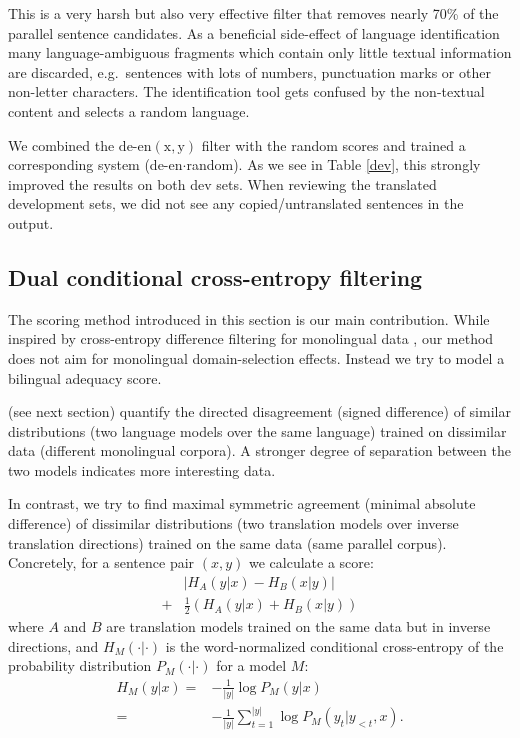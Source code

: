 \documentclass[11pt,a4paper]{article}
\begin{document}
This is a very harsh but also very effective filter that removes nearly 70\% of the parallel sentence candidates. As a beneficial side-effect of language identification many language-ambiguous fragments which contain only little textual information are discarded, e.g.~sentences with lots of numbers, punctuation marks or other non-letter characters. The identification tool gets confused by the non-textual content and selects a random language. 

We combined the $\mathrm{de\textrm{-}en(x,y)}$ filter with the random scores and trained a corresponding system (de-en$\cdot$random). As we see in Table \ref{dev}, this strongly improved the results on both dev sets. When reviewing the translated development sets, we did not see any copied/untranslated sentences in the output.  

\subsection{Dual conditional cross-entropy filtering}
\label{dual}

The scoring method introduced in this section is our main contribution. While inspired by cross-entropy difference filtering for monolingual data \cite{moore-lewis:2010:Short}, our method does not aim for monolingual domain-selection effects. Instead we try to model a bilingual adequacy score. 

\citeauthor{moore-lewis:2010:Short} (see next section) quantify the directed disagreement (signed difference) of similar distributions (two language models over the same language) trained on dissimilar data (different monolingual corpora). A stronger degree of separation between the two models indicates more interesting data.

In contrast, we try to find maximal symmetric agreement (minimal absolute difference) of dissimilar distributions (two translation models over inverse translation directions) trained on the same data (same parallel corpus). Concretely, for a sentence pair $(x,y)$ we calculate a score:
\begin{equation}
\begin{aligned}
  & \left| H_{A}(y|x) - H_{B}(x|y) \right| \\
+ & \frac{1}{2} \left( H_{A}(y|x) + H_{B}(x|y) \right) \label{dualscore}
\end{aligned}
\end{equation}
where $A$ and $B$ are translation models trained on the same data but in inverse directions, and $H_M(\cdot|\cdot)$ is the word-normalized conditional cross-entropy of the probability distribution $P_M(\cdot|\cdot)$ for a model $M$:
\begin{equation*}
\begin{aligned}
H_M(y|x) =& -\frac{1}{|y|}\log P_M(y|x) \\
 =& -\frac{1}{|y|} \sum_{t = 1}^{|y|}\log P_M(y_t|y_{<t},x).
\end{aligned}
\end{equation*}
\end{document}
